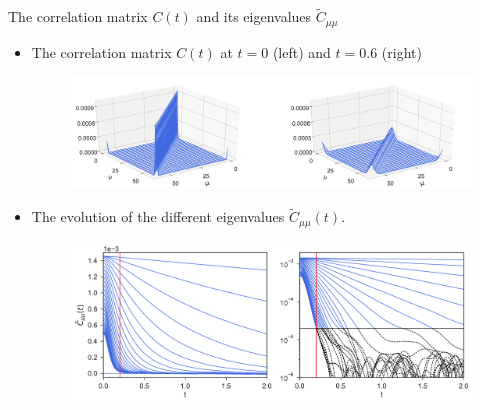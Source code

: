 \documentclass{beamer}
\begin{document}
 
 \begin{frame}{The correlation matrix $C(t)$ and its eigenvalues $\tilde{C}_{\mu\mu}$}
   \begin{itemize}
 \item<1->
   The correlation matrix $C(t)$ at $t=0$ (left) and $t=0.6$ (right)
\begin{figure}[h!]
\includegraphics[width=\linewidth]{Ct-matrix-PBC}
\end{figure}
\item<2->  The evolution of the different eigenvalues $\tilde{C}_{\mu\mu}(t)$. %
\begin{figure}[h!]
  \includegraphics[width=\linewidth]{CtFourier-PBC-exp}
\end{figure}
\end{itemize}
\end{frame}
\end{document}
